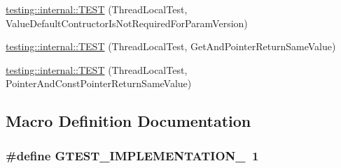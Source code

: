 \begin{DoxyCompactItemize}
\item 
\hyperlink{namespacetesting_1_1internal_a6dffc8331590224259b60e855ad07d03}{testing\-::internal\-::\-T\-E\-S\-T} (Thread\-Local\-Test, Value\-Default\-Contructor\-Is\-Not\-Required\-For\-Param\-Version)
\item 
\hyperlink{namespacetesting_1_1internal_a0e7c2d58a313bec0821df19f44351d84}{testing\-::internal\-::\-T\-E\-S\-T} (Thread\-Local\-Test, Get\-And\-Pointer\-Return\-Same\-Value)
\item 
\hyperlink{namespacetesting_1_1internal_aaed45d6ba960f02e8d3d042c606bc98e}{testing\-::internal\-::\-T\-E\-S\-T} (Thread\-Local\-Test, Pointer\-And\-Const\-Pointer\-Return\-Same\-Value)
\end{DoxyCompactItemize}


\subsection{Macro Definition Documentation}
\hypertarget{gtest-port__test_8cc_a83bd232fd1077579fada92c31bb7469f}{
\subsubsection[{G\-T\-E\-S\-T\-\_\-\-I\-M\-P\-L\-E\-M\-E\-N\-T\-A\-T\-I\-O\-N\-\_\-}]{\setlength{\rightskip}{0pt plus 5cm}\#define G\-T\-E\-S\-T\-\_\-\-I\-M\-P\-L\-E\-M\-E\-N\-T\-A\-T\-I\-O\-N\-\_\-~1}}\label{gtest-port__test_8cc_a83bd232fd1077579fada92c31bb7469f}
